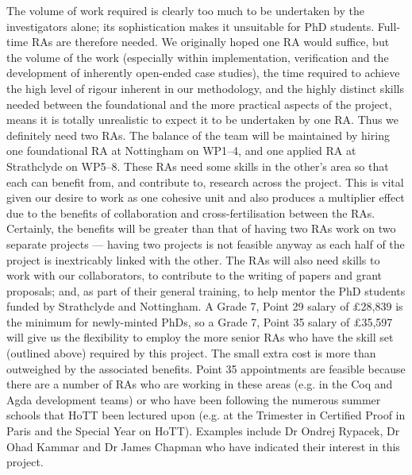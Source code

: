 \documentclass[a4paper,11pt]{article}
\begin{document}
\vspace{0.02in}

The volume of work required is clearly too much to be undertaken by
the investigators alone; its sophistication makes it unsuitable
for PhD students. Full-time RAs are therefore needed. We 
originally hoped one RA would suffice, but the volume of the
work (especially within implementation, verification and the
development of inherently open-ended case studies), the time required
to achieve the high level of rigour inherent in our methodology, and the highly
distinct skills needed between the foundational and the
more practical aspects of the project, means it is totally unrealistic
to expect it to be undertaken by one RA. Thus we definitely need two
RAs. The balance of the team will be maintained by hiring one
foundational RA at
Nottingham on WP1--4, and one applied RA at Strathclyde on WP5--8. These RAs
need some skills in the other's area so that each can benefit from, and
contribute to, research across the project. This is vital given our
desire to work as one cohesive unit and also produces a multiplier
effect due to the benefits of collaboration and cross-fertilisation
between the RAs. Certainly, the benefits will be greater than that of
having two RAs work on two separate projects --- having two 
projects is not feasible anyway as each half of the project is
inextricably linked with the other. The RAs will also need skills to
work with our collaborators, to contribute to the writing of papers
and grant proposals; and, as part of their general training, to help
mentor the PhD students funded by Strathclyde and Nottingham.  A Grade
7, Point 29 salary of $\pounds$28,839 is the minimum for newly-minted
PhDs, so a Grade 7, Point 35 salary of $\pounds$35,597 will give us
the flexibility to employ the more senior RAs who have the 
skill set (outlined above) required by this project. The small extra
cost is more than outweighed by the associated benefits. Point 35
appointments are feasible because there are a number of RAs who are
working in these areas (e.g. in the Coq and Agda development teams) or
who have been following the numerous summer schools that HoTT been
lectured upon (e.g. at the Trimester in Certified Proof in Paris and the
Special Year on HoTT). Examples include Dr Ondrej Rypacek, Dr Ohad Kammar and Dr James
Chapman who have indicated their interest in this project.
\vspace{0.02in}
\end{document}
